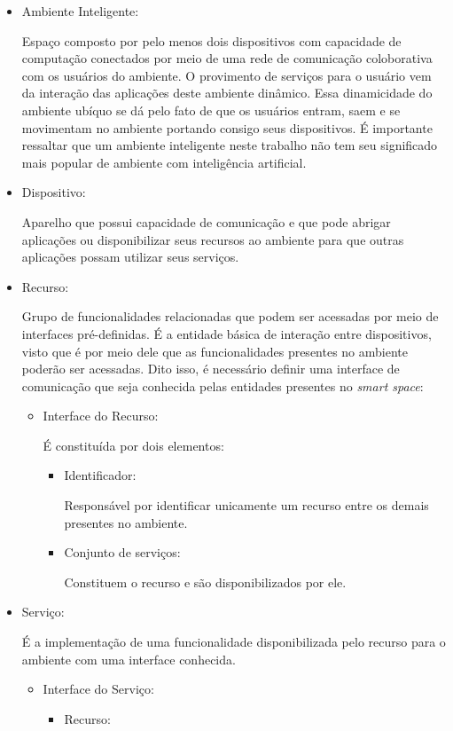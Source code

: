 \begin{itemize}
	\item Ambiente Inteligente:

		Espaço composto por pelo menos dois dispositivos com capacidade de computação conectados por meio de uma rede de comunicação coloborativa com os usuários do ambiente. O provimento de serviços para o usuário vem da interação das aplicações deste ambiente dinâmico. Essa dinamicidade do ambiente ubíquo se dá pelo fato de que os usuários entram, saem e se movimentam no ambiente portando consigo seus dispositivos. É importante ressaltar que um ambiente inteligente neste trabalho não tem seu significado mais popular de ambiente com inteligência artificial.
	\item Dispositivo:

		Aparelho que possui capacidade de comunicação e que pode abrigar aplicações ou disponibilizar seus recursos ao ambiente para que outras aplicações possam utilizar seus serviços.
	\item Recurso:

		Grupo de funcionalidades relacionadas que podem ser acessadas por meio de interfaces pré-definidas. É a entidade básica de interação entre dispositivos, visto que é por meio dele que as funcionalidades presentes no ambiente poderão ser acessadas. Dito isso, é necessário definir uma interface de comunicação que seja conhecida pelas entidades presentes no \emph{smart space}:
		\begin{itemize}
			\item Interface do Recurso:

				É constituída por dois elementos:
				\begin{itemize}
					\item Identificador:

						Responsável por identificar unicamente um recurso entre os demais presentes no ambiente.
					\item Conjunto de serviços:

						Constituem o recurso e são disponibilizados por ele.
				\end{itemize}
		\end{itemize}
	\item Serviço:

		É a implementação de uma funcionalidade disponibilizada pelo recurso para o ambiente com uma interface conhecida.
		\begin{itemize}
			\item Interface do Serviço:
			\begin{itemize}
				\item Recurso:


\end{itemize}
\end{itemize}
\end{itemize}
